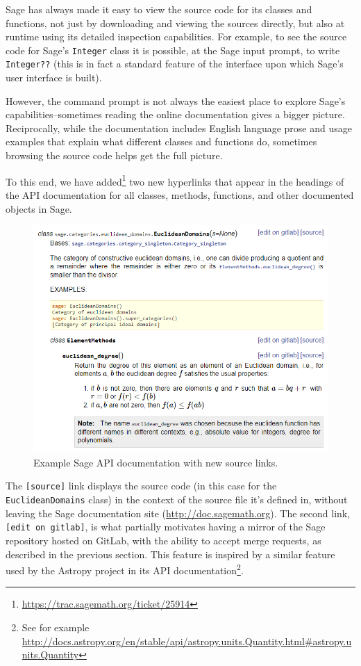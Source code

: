 {Sage has always made it easy to view the source code for its classes and
functions, not just by downloading and viewing the sources directly, but also
at runtime using its detailed inspection capabilities.  For example, to see the
source code for Sage's {\tt Integer} class it is possible, at the Sage input
prompt, to write {\tt Integer??} (this is in fact a standard feature of the
\IPython interface upon which Sage's user interface is built).

However, the command prompt is not always the easiest place to explore Sage's
capabilities--sometimes reading the online documentation gives a bigger
picture. Reciprocally, while the documentation includes English language prose
and usage examples that explain what different classes and functions do,
sometimes browsing the source code helps get the full picture.

To this end, we have
added\footnote{\url{https://trac.sagemath.org/ticket/25914}} two new hyperlinks
that appear in the headings of the API documentation for all classes, methods,
functions, and other documented objects in Sage.

\begin{figure}[!ht]
    \centering
    \includegraphics[width=\textwidth]{screenshots/source-links}
    \caption{Example Sage API documentation with new source links.}
    \label{fig:source-links}
\end{figure}

The {\tt [source]} link displays the source code (in this case for the {\tt
EuclideanDomains} class) in the context of the source file it's defined in,
without leaving the Sage documentation site (\url{http://doc.sagemath.org}).
The second link, {\tt [edit on gitlab]}, is what partially motivates having a
mirror of the Sage repository hosted on GitLab, with the ability to accept
merge requests, as described in the previous section.  This feature is inspired
by a similar feature used by the Astropy project in its API
documentation\footnote{See for example \url{http://docs.astropy.org/en/stable/api/astropy.units.Quantity.html\#astropy.units.Quantity}}.

}
